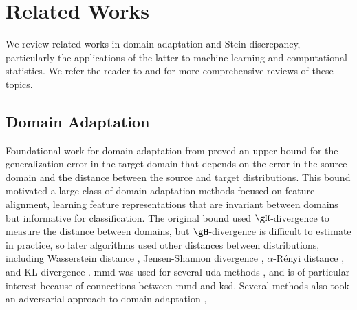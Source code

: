 \section{Related Works}
\label{sec:related-work}

We review related works in domain adaptation and Stein discrepancy, particularly the applications of the latter to machine learning and computational statistics. We refer the reader to \citep{liu2022deep} and \citep{anastasiou_steins_2023} for more comprehensive reviews of these topics.

\subsection{Domain Adaptation}

Foundational work for domain adaptation from \cite{ben-david_analysis_2007, ben-david_theory_2010} proved an upper bound for the generalization error in the target domain that depends on the error in the source domain and the distance between the source and target distributions.
This bound motivated a large class of domain adaptation methods focused on feature alignment, learning feature representations that are invariant between domains but informative for classification.
The original bound used $\gH$-divergence to measure the distance between domains, but
$\gH$-divergence is difficult to estimate in practice, so later algorithms used other distances between distributions, including Wasserstein distance \citep{courty_joint_2017}, Jensen-Shannon divergence \citep{shui_novel_2022}, $\alpha$-R\'enyi distance \citep{mansour2009multiple}, and KL divergence \citep{nguyenkl}.
\Ac{mmd} was used for several \ac{uda} methods \citep{long_learning_2015, long_deep_2017, rozantsev2018beyond}, and is of particular interest because of connections between \ac{mmd} and \ac{ksd}.
Several methods also took an adversarial approach to domain adaptation \citep{ganin_unsupervised_2015,liu_coupled_2016, zhang_bridging_2019},
